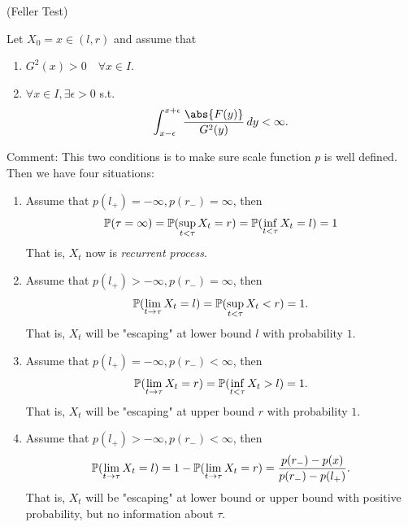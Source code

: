 \begin{thm}{(Feller Test)}\label{thm: Feller}

Let $X_0  = x  \in (l ,r)$ and assume that 
\begin{enumerate}
    \item $G^2(x) > 0 \quad \forall x\in I$.
    \item $\forall x \in I, \exists \epsilon >0$ s.t. \begin{equation*}
        \int_{x-\epsilon}^{x+\epsilon} \frac{\abs{F(y)}}{G^2(y)} \diff y < \infty.
    \end{equation*}
\end{enumerate}

Comment: This two conditions is to make sure scale function $p$ is well defined. Then we have four situations:
\begin{enumerate}
    \item Assume that $p(l_+) = -\infty, p(r_-) = \infty$, then
        \begin{equation*}
            \mathbb{P}(\tau = \infty) = \mathbb{P}(\sup_{t < \tau} X_t = r) = \mathbb{P}(\inf_{t < \tau} X_t = l) = 1
        \end{equation*}
        That is, $X_t$ now is \textit{recurrent process}.
    \item Assume that $p(l_+) > -\infty, p(r_-) = \infty$, then
        \begin{equation*}
            \mathbb{P}(\lim\limits_{t\rightarrow \tau} X_t = l) = \mathbb{P}(\sup_{t < \tau} X_t < r) = 1.
        \end{equation*}
        That is, $X_t$ will be "escaping" at lower bound $l$ with probability $1$.
    \item Assume that $p(l_+) = -\infty, p(r_-) < \infty$, then
        \begin{equation*}
            \mathbb{P}(\lim\limits_{t\rightarrow \tau} X_t = r) = \mathbb{P}(\inf_{t < \tau} X_t > l) = 1.
        \end{equation*}
        That is, $X_t$ will be "escaping" at upper bound $r$ with probability $1$.
    \item Assume that $p(l_+) > -\infty, p(r_-) < \infty$, then
        \begin{equation*}
            \mathbb{P}(\lim\limits_{t\rightarrow \tau} X_t = l) = 1- \mathbb{P}(\lim\limits_{t\rightarrow \tau} X_t = r) = \frac{p(r_-) - p(x)}{p(r_-) - p(l_+)}.
        \end{equation*}
        That is, $X_t$ will be "escaping" at lower bound or upper bound with positive probability, but no information about $\tau$.
\end{enumerate}
\end{thm}

